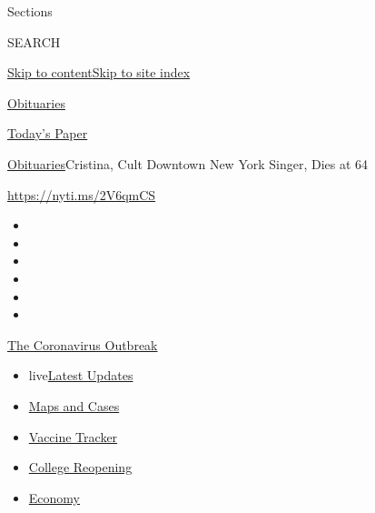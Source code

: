 Sections

SEARCH

\protect\hyperlink{site-content}{Skip to
content}\protect\hyperlink{site-index}{Skip to site index}

\href{https://www.nytimes3xbfgragh.onion/section/obituaries}{Obituaries}

\href{https://myaccount.nytimes3xbfgragh.onion/auth/login?response_type=cookie\&client_id=vi}{}

\href{https://www.nytimes3xbfgragh.onion/section/todayspaper}{Today's
Paper}

\href{/section/obituaries}{Obituaries}\textbar{}Cristina, Cult Downtown
New York Singer, Dies at 64

\url{https://nyti.ms/2V6qmCS}

\begin{itemize}
\item
\item
\item
\item
\item
\item
\end{itemize}

\href{https://www.nytimes3xbfgragh.onion/news-event/coronavirus?action=click\&pgtype=Article\&state=default\&region=TOP_BANNER\&context=storylines_menu}{The
Coronavirus Outbreak}

\begin{itemize}
\tightlist
\item
  live\href{https://www.nytimes3xbfgragh.onion/2020/08/04/world/coronavirus-covid-19.html?action=click\&pgtype=Article\&state=default\&region=TOP_BANNER\&context=storylines_menu}{Latest
  Updates}
\item
  \href{https://www.nytimes3xbfgragh.onion/interactive/2020/us/coronavirus-us-cases.html?action=click\&pgtype=Article\&state=default\&region=TOP_BANNER\&context=storylines_menu}{Maps
  and Cases}
\item
  \href{https://www.nytimes3xbfgragh.onion/interactive/2020/science/coronavirus-vaccine-tracker.html?action=click\&pgtype=Article\&state=default\&region=TOP_BANNER\&context=storylines_menu}{Vaccine
  Tracker}
\item
  \href{https://www.nytimes3xbfgragh.onion/2020/08/02/us/covid-college-reopening.html?action=click\&pgtype=Article\&state=default\&region=TOP_BANNER\&context=storylines_menu}{College
  Reopening}
\item
  \href{https://www.nytimes3xbfgragh.onion/live/2020/08/03/business/stock-market-today-coronavirus?action=click\&pgtype=Article\&state=default\&region=TOP_BANNER\&context=storylines_menu}{Economy}
\end{itemize}

